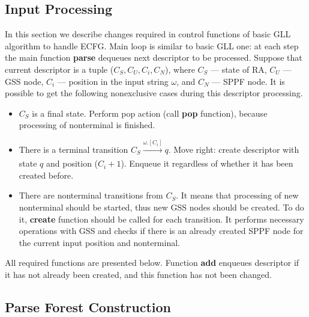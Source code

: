 \documentclass[runningheads,a4paper]{llncs}
\begin{document}
\subsection{Input Processing}%

In this section we describe changes required in control functions of basic GLL algorithm to handle ECFG.
Main loop is similar to basic GLL one: at each step the main function \textbf{parse} dequeues next descriptor to be processed.
Suppose that current descriptor is a tuple ($C_S, C_U, C_i, C_N$), where $C_S$ --- state of RA, $C_U$ --- GSS node, $C_i$ --- position in the input string $\omega$, and $C_N$ --- SPPF node. 
It is possible to get the following nonexclusive cases during this descriptor processing.

\begin{itemize} 
\item $C_S$ is a final state. Perform pop action (call \textbf{pop} function), because processing of nonterminal is finished.
\item There is a terminal transition $C_S \xrightarrow[]{\omega.[C_i]} q$. 
Move right: create descriptor with state $ q $ and position ($ C_i + 1 $).
Enqueue it regardless of whether it has been created before.
\item There are nonterminal transitions from $C_S$.
It means that processing of new nonterminal should be started, thus new GSS nodes should be created.
To do it, \textbf{create} function should be called for each transition.
It performs necessary operations with GSS and checks if there is an already created SPPF node for the current input position and nonterminal.
\end{itemize}

All required functions are presented below.
Function \textbf{add} enqueues descriptor if it has not already been created, and this function has not been changed.










\subsection{Parse Forest Construction}
\end{document}
